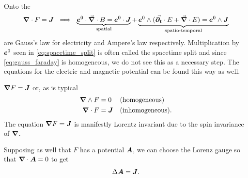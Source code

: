 \documentclass{article}
\begin{document}
Onto the 
\begin{align}
\label{eq:spacetime_split}
	\boldsymbol{\nabla} \cdot F=\boldsymbol{J}~\implies~ \underbrace{\boldsymbol{e}^0 \cdot \vec{\boldsymbol{\nabla}} \cdot B = \boldsymbol{e}^0 \cdot \boldsymbol{J}}_{\textrm{spatial}} +  \underbrace{\boldsymbol{e}^0 \wedge (\vec{\boldsymbol{\partial_t}} \cdot E + \vec{\boldsymbol{\nabla}} \cdot E) = \boldsymbol{e}^0 \wedge \boldsymbol{J}}_{\textrm{spatio-temporal}}
\end{align}
are Gauss's law for electricity and Ampere's law respectively. Multiplication by $\boldsymbol{e}^0$ seen in \cref{eq:spacetime_split} is often called the spacetime split and since \cref{eq:gauss_faraday} is homogeneous, we do not see this as a necessary step. The equations for the electric and magnetic potential can be found this way as well.


$\boldsymbol{\nabla} F = \boldsymbol{J}$ or, as is typical
\begin{align}
	\boldsymbol{\nabla} \wedge F &= 0  &&\textrm{(homogeneous)}\\
	\boldsymbol{\nabla} \cdot F &= \boldsymbol{J} && \textrm{(inhomogeneous)}.
\end{align}
The equation $\boldsymbol{\nabla} F = \boldsymbol{J}$ is manifestly Lorentz invariant due to the spin invariance of $\boldsymbol{\nabla}$. 

Supposing as well that $F$ has a potential $\boldsymbol{A}$, we can choose the Lorenz gauge so that $\boldsymbol{\nabla} \cdot \boldsymbol{A} = 0$ to get
\begin{equation}
\Delta \boldsymbol{A} = \boldsymbol{J}.
\end{equation}



\end{document}
